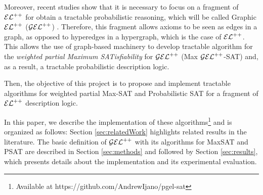 Moreover, recent studies show that it is necessary to focus on a fragment of $\mathcal{EL}^{++}$ for obtain a tractable probabilistic reasoning, which will be called {Graphic} $\mathcal{EL}^{++}$ ($\mathcal{GEL}^{++}$) \citep{Fin2020}. Therefore, this fragment allows axioms to be seen as edges in a graph, as opposed to hyperedges in a hypergraph, which is the case of $\mathcal{EL}^{++}$. This allows the use of graph-based machinery to develop tractable algorithm for the \emph{weighted partial Maximum SATisfiability} for $\mathcal{GEL}^{++}$ (Max $\mathcal{GEL}^{++}$-SAT) and, as a result, a tractable probabilistic description logic.

Then, the objective of this project is to propose and implement tractable algorithms for weighted partial Max-SAT and Probabilistic SAT for a fragment of $\mathcal{EL}^{++}$ description logic.

In this paper, we describe the implementation of these algorithms\footnote{Available at https://github.com/AndrewIjano/pgel-sat} and is organized as follows: Section \ref{sec:relatedWork} highlights related results in the literature. The basic definition of $\mathcal{GEL}^{++}$ with its algorithms for MaxSAT and PSAT are described in Section \ref{sec:methods} and followed by Section \ref{sec:results}, which presents details about the implementation and its experimental evaluation.
